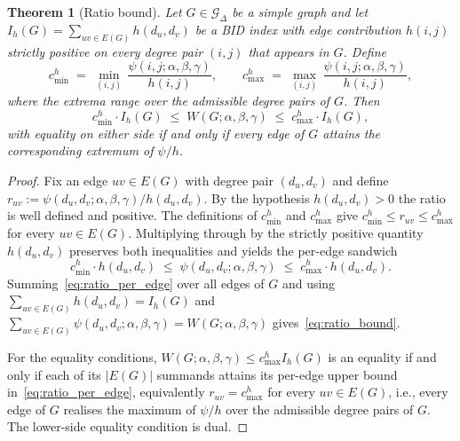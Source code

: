 \documentclass[a5paper, 10pt]{article}
\theoremstyle{plain}
\newtheorem{theorem}{Theorem}
\theoremstyle{remark}
\theoremstyle{definition}
\newcommand{\Wuzi}{W(G;\alpha,\beta,\gamma)}
\begin{document}
\begin{theorem}[Ratio bound]\label{thm:ratio_bound}
Let $G \in \mathcal{G}_{\Delta}$ be a simple graph and let
$I_h(G) = \sum_{uv \in E(G)} h(d_u, d_v)$ be a BID index with
edge contribution $h(i, j)$ strictly positive on every degree pair
$(i, j)$ that appears in $G$. Define
\[
c_{\min}^{h} \;=\; \min_{(i, j)}\,\frac{\psi(i, j; \alpha, \beta, \gamma)}{h(i, j)},
\qquad
c_{\max}^{h} \;=\; \max_{(i, j)}\,\frac{\psi(i, j; \alpha, \beta, \gamma)}{h(i, j)},
\]
where the extrema range over the admissible degree pairs of $G$.
Then
\begin{equation}\label{eq:ratio_bound}
c_{\min}^{h} \cdot I_h(G)
\;\le\; \Wuzi
\;\le\; c_{\max}^{h} \cdot I_h(G),
\end{equation}
with equality on either side if and only if every edge of $G$
attains the corresponding extremum of $\psi/h$.
\end{theorem}

\begin{proof}
Fix an edge $uv \in E(G)$ with degree pair $(d_u, d_v)$ and define
$r_{uv} := \psi(d_u, d_v; \alpha, \beta, \gamma)/h(d_u, d_v)$.
By the hypothesis $h(d_u, d_v) > 0$ the ratio is well defined and
positive. The definitions of $c_{\min}^{h}$ and $c_{\max}^{h}$
give
$c_{\min}^{h} \le r_{uv} \le c_{\max}^{h}$ for every
$uv \in E(G)$. Multiplying through by the strictly positive
quantity $h(d_u, d_v)$ preserves both inequalities and yields the
per-edge sandwich
\begin{equation}\label{eq:ratio_per_edge}
c_{\min}^{h} \cdot h(d_u, d_v)
\;\le\; \psi(d_u, d_v; \alpha, \beta, \gamma)
\;\le\; c_{\max}^{h} \cdot h(d_u, d_v).
\end{equation}
Summing~\eqref{eq:ratio_per_edge} over all edges of $G$ and using
$\sum_{uv \in E(G)} h(d_u, d_v) = I_h(G)$ and
$\sum_{uv \in E(G)} \psi(d_u, d_v; \alpha, \beta, \gamma) = \Wuzi$
gives~\eqref{eq:ratio_bound}.

For the equality conditions, $\Wuzi \le c_{\max}^{h} I_h(G)$ is an
equality if and only if each of its $|E(G)|$ summands attains its
per-edge upper bound in~\eqref{eq:ratio_per_edge}, equivalently
$r_{uv} = c_{\max}^{h}$ for every $uv \in E(G)$, i.e., every edge
of $G$ realises the maximum of $\psi/h$ over the admissible
degree pairs of $G$. The lower-side equality condition is dual.
\end{proof}
\end{document}

